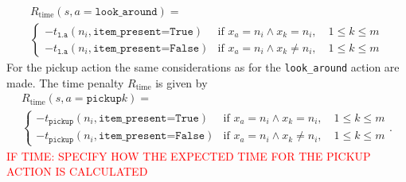 \begin{multline}
    R_\text{time}(s, a=\texttt{look\_around}) = \\\begin{cases}
    -t_\texttt{l.a}(n_i, \texttt{item\_present=True}) & \text{if }x_a=n_i \land x_k=n_i, \quad 1\leq k \leq m\\
    -t_\texttt{l.a}(n_i, \texttt{item\_present=False}) & \text{if }x_a=n_i \land x_k \neq n_i,\quad  1\leq k \leq m
    \end{cases}
\end{multline}
For the pickup action  the same considerations as for the \texttt{look\_around} action are made. The time penalty $R_\text{time}$ is given by
\begin{multline}
    R_\text{time}(s, a=\texttt{pickup}k) = \\ \begin{cases}
    -t_\texttt{pickup}(n_i, \texttt{item\_present=True}) & \text{if }x_a=n_i \land x_k=n_i, \quad 1\leq k \leq m\\
    -t_\texttt{pickup}(n_i, \texttt{item\_present=False}) & \text{if }x_a=n_i \land x_k \neq n_i,\quad  1\leq k \leq m
    \end{cases}.
\end{multline}
\textcolor{red}{IF TIME: SPECIFY HOW THE EXPECTED TIME FOR THE PICKUP ACTION IS CALCULATED}



